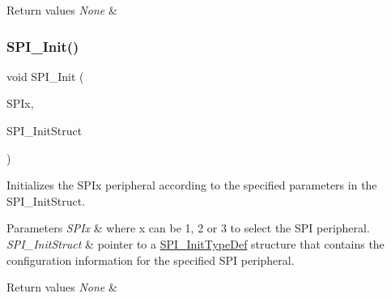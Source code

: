 \begin{DoxyRetVals}{Return values}
{\em None} & \\
\hline
\end{DoxyRetVals}
\mbox{\label{group___s_p_i___private___functions_ga8dacc1dc48bf08c0f12da409f4889037}} 
\subsubsection{\texorpdfstring{SPI\_Init()}{SPI\_Init()}}
{\footnotesize\ttfamily void S\+P\+I\+\_\+\+Init (\begin{DoxyParamCaption}\item[{\mbox{\hyperlink{struct_s_p_i___type_def}{S\+P\+I\+\_\+\+Type\+Def}} $\ast$}]{S\+P\+Ix,  }\item[{\mbox{\hyperlink{struct_s_p_i___init_type_def}{S\+P\+I\+\_\+\+Init\+Type\+Def}} $\ast$}]{S\+P\+I\+\_\+\+Init\+Struct }\end{DoxyParamCaption})}



Initializes the S\+P\+Ix peripheral according to the specified parameters in the S\+P\+I\+\_\+\+Init\+Struct. 


\begin{DoxyParams}{Parameters}
{\em S\+P\+Ix} & where x can be 1, 2 or 3 to select the S\+PI peripheral. \\
\hline
{\em S\+P\+I\+\_\+\+Init\+Struct} & pointer to a \mbox{\hyperlink{struct_s_p_i___init_type_def}{S\+P\+I\+\_\+\+Init\+Type\+Def}} structure that contains the configuration information for the specified S\+PI peripheral. \\
\hline
\end{DoxyParams}

\begin{DoxyRetVals}{Return values}
{\em None} & \\
\hline
\end{DoxyRetVals}
\mbox{\label{group___s_p_i___private___functions_ga56fc508a482f032f9eb80e4c63184126}} 
